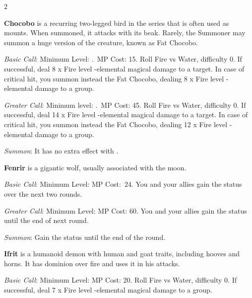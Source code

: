 \begin{multicols}{2}
    \ffcrystal[type=level,height=8pt]
    
    \textbf{Chocobo} is a recurring two-legged bird in the series that is often used as mounts. When summoned, it attacks with its beak. Rarely, the Summoner may summon a huge version of the creature, known as Fat Chocobo.

    \textit{Basic Call}: Minimum Level: .\ MP Cost: 15. Roll Fire vs Water, difficulty 0. If successful, deal 8 x Fire level -elemental magical damage to a target. In case of critical hit, you summon instead the Fat Chocobo, dealing 8 x Fire level -elemental damage to a group.
    
    \textit{Greater Call}: Minimum level: .\ MP Cost: 45. Roll Fire vs Water, difficulty 0. If successful, deal 14 x Fire level -elemental magical damage to a target. In case of critical hit, you summon instead the Fat Chocobo, dealing 12 x Fire level -elemental damage to a group.
    
	\textit{Summon}: It has no extra effect with .

    \ffcrystal[type=level,height=8pt]
    
    \textbf{Fenrir} is a gigantic wolf, usually associated with the moon.

	\textit{Basic Call}: Minimum Level:  MP Cost:\ 24. You and your allies gain the  status over the next two rounds.
    
    \textit{Greater Call}: Minimum Level:  MP Cost: 60. You and your allies gain the  status until the end of next round.
    
    \textit{Summon}: Gain the  status until the end of the round.

    \ffcrystal[type=level,height=8pt]

    \textbf{Ifrit} is a humanoid demon with human and goat traits, including hooves and horns. It has dominion over fire and uses it in his attacks.
    
    \textit{Basic Call}: Minimum Level:  MP Cost: 20. Roll Fire vs Water, difficulty 0. If successful, deal 7 x Fire level -elemental magical damage to a group.
    

\end{multicols}
